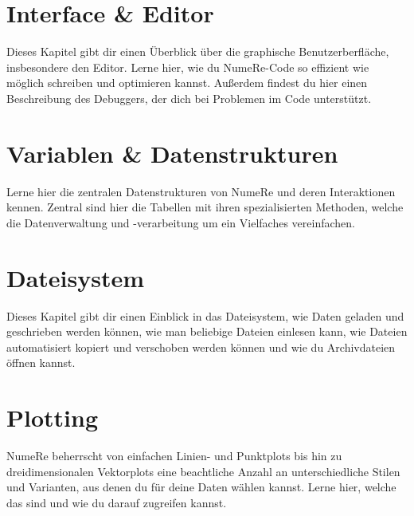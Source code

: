 \documentclass[DIV=17, parskip=half]{scrreprt}
\begin{document}
	\chapter{Interface \& Editor}
		Dieses Kapitel gibt dir einen \"Uberblick \"uber die graphische Benutzerberfl\"ache, insbesondere den Editor. Lerne hier, wie du NumeRe-Code so effizient wie m\"oglich schreiben und optimieren kannst. Au\ss erdem findest du hier einen Beschreibung des Debuggers, der dich bei Problemen im Code unterst\"utzt.
		
		
		
		
		
		
		
		
		
		
		
	\chapter{Variablen \& Datenstrukturen}
		Lerne hier die zentralen Datenstrukturen von NumeRe und deren Interaktionen kennen. Zentral sind hier die Tabellen mit ihren spezialisierten Methoden, welche die Datenverwaltung und -verarbeitung um ein Vielfaches vereinfachen.
		
		
		
		
		
		
		
		
	
	\chapter{Dateisystem}
		Dieses Kapitel gibt dir einen Einblick in das Dateisystem, wie Daten geladen und geschrieben werden k\"onnen, wie man beliebige Dateien einlesen kann, wie Dateien automatisiert kopiert und verschoben werden k\"onnen und wie du Archivdateien \"offnen kannst.
		
		
		
		
		
		
		
	
	\chapter{Plotting}
		NumeRe beherrscht von einfachen Linien- und Punktplots bis hin zu dreidimensionalen Vektorplots eine beachtliche Anzahl an unterschiedliche Stilen und Varianten, aus denen du f\"ur deine Daten w\"ahlen kannst. Lerne hier, welche das sind und wie du darauf zugreifen kannst.
		
		
		
		
		
		
		
		
		
		
		
		
		
		
		
		
		
	
\end{document}
